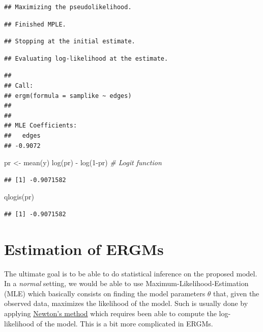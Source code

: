 \documentclass[
]{book}
\newenvironment{Shaded}{\begin{snugshade}}{\end{snugshade}}
\newcommand{\CommentTok}[1]{\textcolor[rgb]{0.56,0.35,0.01}{\textit{#1}}}
\newcommand{\DecValTok}[1]{\textcolor[rgb]{0.00,0.00,0.81}{#1}}
\newcommand{\FunctionTok}[1]{\textcolor[rgb]{0.00,0.00,0.00}{#1}}
\newcommand{\NormalTok}[1]{#1}
\newcommand{\OtherTok}[1]{\textcolor[rgb]{0.56,0.35,0.01}{#1}}
\newcommand{\SpecialCharTok}[1]{\textcolor[rgb]{0.00,0.00,0.00}{#1}}
\begin{document}
\begin{verbatim}
## Maximizing the pseudolikelihood.
\end{verbatim}

\begin{verbatim}
## Finished MPLE.
\end{verbatim}

\begin{verbatim}
## Stopping at the initial estimate.
\end{verbatim}

\begin{verbatim}
## Evaluating log-likelihood at the estimate.
\end{verbatim}

\begin{verbatim}
## 
## Call:
## ergm(formula = samplike ~ edges)
## 
## 
## MLE Coefficients:
##   edges  
## -0.9072
\end{verbatim}

\begin{Shaded}
\begin{Highlighting}[]
\NormalTok{pr }\OtherTok{\textless{}{-}} \FunctionTok{mean}\NormalTok{(y)}
\FunctionTok{log}\NormalTok{(pr) }\SpecialCharTok{{-}} \FunctionTok{log}\NormalTok{(}\DecValTok{1}\SpecialCharTok{{-}}\NormalTok{pr) }\CommentTok{\# Logit function}
\end{Highlighting}
\end{Shaded}

\begin{verbatim}
## [1] -0.9071582
\end{verbatim}

\begin{Shaded}
\begin{Highlighting}[]
\FunctionTok{qlogis}\NormalTok{(pr)}
\end{Highlighting}
\end{Shaded}

\begin{verbatim}
## [1] -0.9071582
\end{verbatim}

\hypertarget{estimation-of-ergms}{%
\section{Estimation of ERGMs}\label{estimation-of-ergms}}

The ultimate goal is to be able to do statistical inference on the proposed model. In a \emph{normal} setting, we would be able to use Maximum-Likelihood-Estimation (MLE) which basically consists on finding the model parameters \(\theta\) that, given the observed data, maximizes the likelihood of the model. Such is usually done by applying \href{https://en.wikipedia.org/wiki/Newton\%27s_method_in_optimization}{Newton's method} which requires been able to compute the log-likelihood of the model. This is a bit more complicated in ERGMs.
\end{document}
